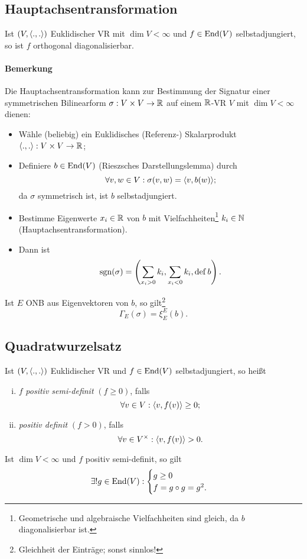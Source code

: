 \subsection{Hauptachsentransformation}
	Ist $ (V,\langle .,. \rangle) $ Euklidischer VR mit $ \dim V<\infty $ und $ f\in \operatorname{End}(V) $ selbstadjungiert, so ist $ f $ orthogonal diagonalisierbar.
\paragraph{Bemerkung}
	Die Hauptachsentransformation kann zur Bestimmung der Signatur einer symmetrischen Bilinearform $ \sigma:V\times V\to \mathbb{R} $ auf einem $ \mathbb{R} $-VR $ V $ mit $ \dim V <\infty $ dienen:
		\begin{itemize}
			\item Wähle (beliebig) ein Euklidisches (Referenz-) Skalarprodukt $ \langle .,. \rangle:V\times V\to \mathbb{R} $;
			\item Definiere $ b\in \operatorname{End}(V) $ (Rieszsches Darstellungslemma) durch
				\[ \forall v,w\in V: \sigma(v,w) = \langle v,b(w) \rangle; \]
			da $ \sigma $ symmetrisch ist, ist $ b $ selbstadjungiert.
			\item Bestimme Eigenwerte $ x_i\in \mathbb{R} $ von $ b $ mit Vielfachheiten\footnote{Geometrische und algebraische Vielfachheiten sind gleich, da $ b $ diagonalisierbar ist.} $ k_i\in \mathbb{N} $ (Hauptachsentransformation).
			\item Dann ist
				\[ \operatorname{sgn}(\sigma) = \left(\sum_{x_i>0}k_i, \sum_{x_i<0}k_i,\operatorname{def} b\right). \]
		\end{itemize}
	Ist $ E $ ONB aus Eigenvektoren von $ b $, so gilt\footnote{Gleichheit der Einträge; sonst sinnlos!}
		\[ \Gamma_E(\sigma) = \xi_E^E(b). \]
\subsection{Quadratwurzelsatz}
	Ist $ (V,\langle .,. \rangle) $ Euklidischer VR und $ f\in \operatorname{End}(V) $ selbstadjungiert, so heißt
		\begin{enumerate}[(i)]
			\item $ f $ \emph{positiv semi-definit} $ (f\geq 0) $, falls
				\[ \forall v\in V :\langle v,f(v) \rangle\geq 0;\]
			\item \emph{positiv definit} $ (f>0) $, falls
				\[ \forall v\in V^\times: \langle v,f(v) \rangle>0. \]
		\end{enumerate}
	Ist $ \dim V < \infty $ und $ f $ positiv semi-definit, so gilt
		\[ \exists! g\in \operatorname{End}(V): \begin{cases}
		g\geq 0\\f = g\circ g =g^2.
		\end{cases} \]
